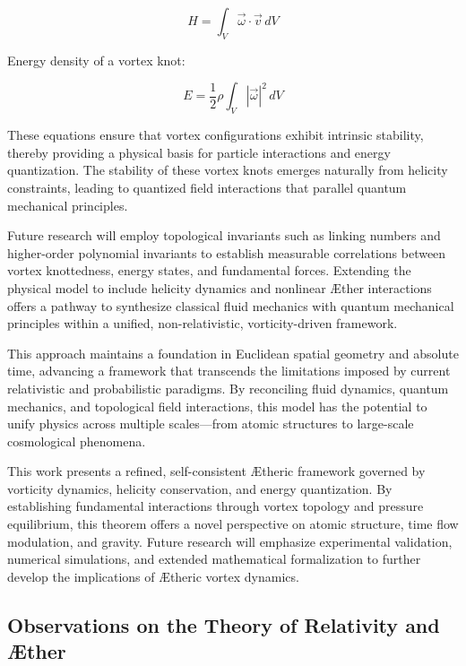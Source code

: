     \begin{equation}
        H = \int_V \vec{\omega} \cdot \vec{v} \, dV\label{eq:HelicityConservation}
    \end{equation}

Energy density of a vortex knot:

    \begin{equation}
        E = \frac{1}{2} \rho \int_V |\vec{\omega}|^2 \, dV\label{eq:EnergyDensity}
    \end{equation}

These equations ensure that vortex configurations exhibit intrinsic stability, thereby providing a physical basis for particle interactions and energy quantization.
The stability of these vortex knots emerges naturally from helicity constraints, leading to quantized field interactions that parallel quantum mechanical principles.

Future research will employ topological invariants such as linking numbers and higher-order polynomial invariants to establish measurable correlations between vortex knottedness, energy states, and fundamental forces.
Extending the physical model to include helicity dynamics and nonlinear \AE ther interactions offers a pathway to synthesize classical fluid mechanics with quantum mechanical principles within a unified, non-relativistic, vorticity-driven framework.

This approach maintains a foundation in Euclidean spatial geometry and absolute time, advancing a framework that transcends the limitations imposed by current relativistic and probabilistic paradigms.
By reconciling fluid dynamics, quantum mechanics, and topological field interactions, this model has the potential to unify physics across multiple scales—from atomic structures to large-scale cosmological phenomena.


This work presents a refined, self-consistent \AE theric framework governed by vorticity dynamics, helicity conservation, and energy quantization.
By establishing fundamental interactions through vortex topology and pressure equilibrium, this theorem offers a novel perspective on atomic structure, time flow modulation, and gravity.
Future research will emphasize experimental validation, numerical simulations, and extended mathematical formalization to further develop the implications of \AE theric vortex dynamics.



\subsection{Observations on the Theory of Relativity and \AE ther}\label{subsec:observations-on-the-theory-of-relativity}
